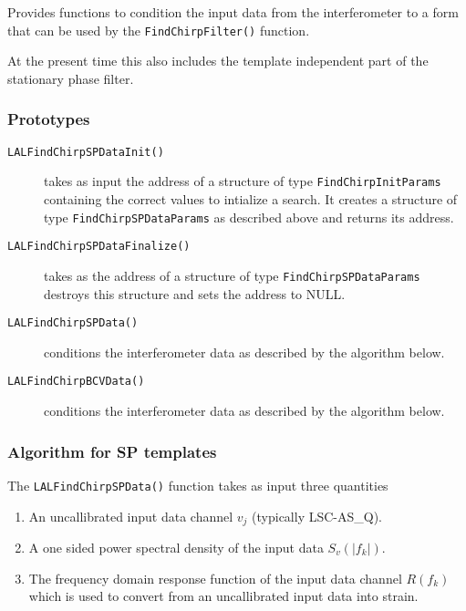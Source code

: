 Provides functions to condition the input data from the interferometer
to a form that can be used by the \texttt{FindChirpFilter()} function.

At the present time this also includes the template independent part of the
stationary phase filter.

\subsubsection*{Prototypes}
\vspace{0.1in}


\begin{description}
\item[\texttt{LALFindChirpSPDataInit()}] takes as input the address
of a structure of type \texttt{FindChirpInitParams} containing the correct
values to intialize a search. It creates a structure of type
\texttt{FindChirpSPDataParams} as described above and returns its address.

\item[\texttt{LALFindChirpSPDataFinalize()}] takes as the address
of a structure of type \texttt{FindChirpSPDataParams} destroys this
structure and sets the address to NULL.

\item[\texttt{LALFindChirpSPData()}] conditions the interferometer data
as described by the algorithm below.

\item[\texttt{LALFindChirpBCVData()}] conditions the interferometer data
as described by the algorithm below.
\end{description}

\subsubsection*{Algorithm for SP templates}

The \texttt{LALFindChirpSPData()} function takes as input three quantities
\begin{enumerate}
\item An uncallibrated input data channel $v_j$ (typically LSC-AS\_Q).
\item A one sided power spectral density of the input data $S_v(|f_k|)$.
\item The frequency domain response function of the input data channel
$R(f_k)$ which is used to convert from an uncallibrated input data into
strain.
\end{enumerate}

